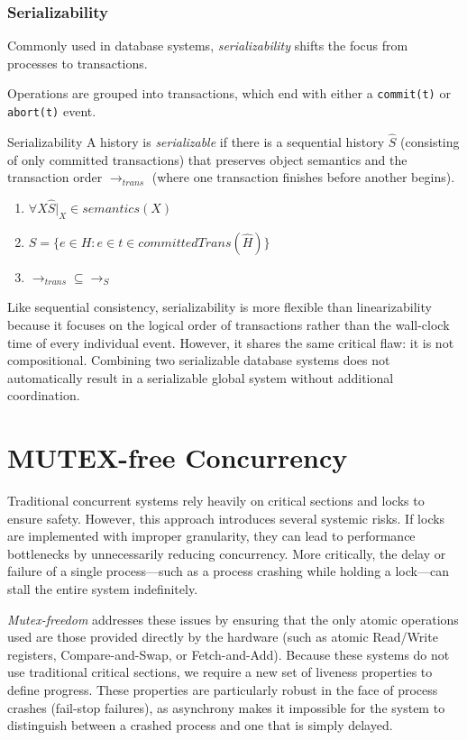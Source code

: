 \subsection{Serializability}
Commonly used in database systems, \textit{serializability} shifts the focus from processes to transactions.

Operations are grouped into transactions, which end with either a \texttt{commit(t)} or \texttt{abort(t)} event.

\begin{Definition}{Serializability}{}
    A history is \textit{serializable} if there is a sequential history $\widehat{S}$ (consisting of only committed transactions) that preserves object semantics and the transaction order $\longrightarrow_{trans}$ (where one transaction finishes before another begins).

    \begin{enumerate}
        \item $\forall X \widehat{S}|_X \in semantics(X)$
        \item $S=\{e\in H: e\in t\in committedTrans(\widehat{H})\}$
        \item $\longrightarrow_{trans} \subseteq \longrightarrow_S$
    \end{enumerate}
\end{Definition}

Like sequential consistency, serializability is more flexible than linearizability because it focuses on the logical order of transactions rather than the wall-clock time of every individual event. However, it shares the same critical flaw: it is not compositional. Combining two serializable database systems does not automatically result in a serializable global system without additional coordination.


\chapter{MUTEX-free Concurrency}
Traditional concurrent systems rely heavily on critical sections and locks to ensure safety. However, this approach introduces several systemic risks. If locks are implemented with improper granularity, they can lead to performance bottlenecks by unnecessarily reducing concurrency. More critically, the delay or failure of a single process—such as a process crashing while holding a lock—can stall the entire system indefinitely.

\textit{Mutex-freedom} addresses these issues by ensuring that the only atomic operations used are those provided directly by the hardware (such as atomic Read/Write registers, Compare-and-Swap, or Fetch-and-Add). Because these systems do not use traditional critical sections, we require a new set of liveness properties to define progress. These properties are particularly robust in the face of process crashes (fail-stop failures), as asynchrony makes it impossible for the system to distinguish between a crashed process and one that is simply delayed.

